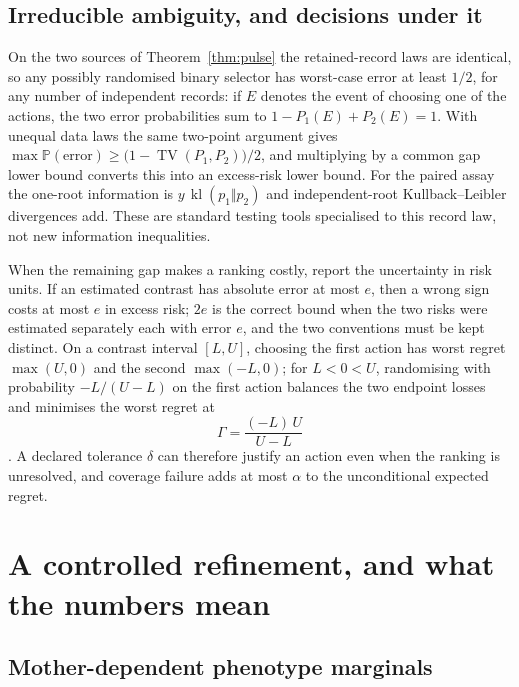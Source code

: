 \documentclass[11pt]{article}
\theoremstyle{plain}
\theoremstyle{definition}
\theoremstyle{remark}
\newcommand{\Prob}{\mathbb P}
\newcommand{\TV}{\operatorname{TV}}
\newcommand{\kl}{\operatorname{kl}}
\begin{document}
\subsection{Irreducible ambiguity, and decisions under it}

On the two sources of Theorem~\ref{thm:pulse} the retained-record laws are
identical, so any possibly randomised binary selector has worst-case error at
least $1/2$, for any number of independent records: if $E$ denotes the event of
choosing one of the actions, the two error probabilities sum to
$1-P_1(E)+P_2(E)=1$. With unequal data laws the same two-point argument gives
$\max\Prob(\text{error})\ge\bigl(1-\TV(P_1,P_2)\bigr)/2$, and multiplying by a
common gap lower bound converts this into an excess-risk lower bound. For the
paired assay the one-root information is $y\,\kl(p_1\Vert p_2)$ and
independent-root Kullback--Leibler divergences add. These are standard testing
tools \citep{Tsybakov2009,KaufmannCappeGarivier2016} specialised to this record
law, not new information inequalities.

When the remaining gap makes a ranking costly, report the uncertainty in risk
units. If an estimated contrast has absolute error at most $e$, then a wrong
sign costs at most $e$ in excess risk; $2e$ is the correct bound when the two
risks were estimated separately each with error $e$, and the two conventions
must be kept distinct. On a contrast interval $[L,U]$, choosing the first
action has worst regret $\max(U,0)$ and the second $\max(-L,0)$; for $L<0<U$,
randomising with probability $-L/(U-L)$ on the first action balances the two
endpoint losses and minimises the worst regret at
\begin{equation}\label{eq:regret}
 \Gamma=\frac{(-L)\,U}{U-L}
\end{equation}
\citep{Stoye2012,Manski2004}. A declared tolerance $\delta$ can therefore
justify an action even when the ranking is unresolved, and coverage failure
adds at most $\alpha$ to the unconditional expected regret.

\section{A controlled refinement, and what the numbers mean}
\label{sec:refinement}

\subsection{Mother-dependent phenotype marginals}
\end{document}
